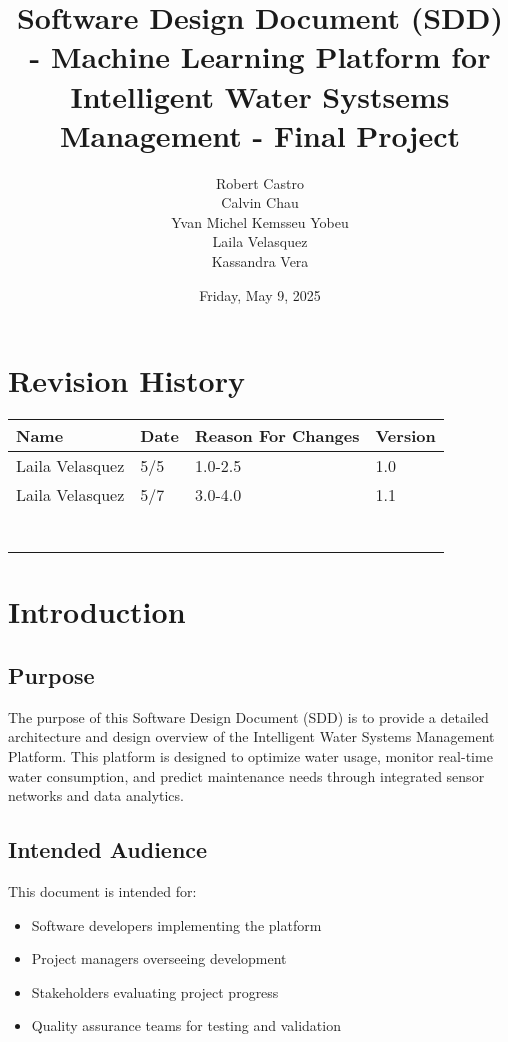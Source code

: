 \documentclass{article}
\title{Software Design Document (SDD) - Machine Learning Platform for Intelligent Water Systsems Management - Final Project}
\author{Robert Castro\\
Calvin Chau\\
Yvan Michel Kemsseu Yobeu\\
Laila Velasquez\\
Kassandra Vera}
\date{Friday, May 9, 2025}
\begin{document}
\maketitle
\newpage
\tableofcontents

\newpage

\section*{Revision History}
\begin{center}
\begin{tabular}{|l|l|l|l|}
\hline
Name & Date & Reason For Changes & Version \\
\hline
Laila Velasquez & 5/5 & 1.0-2.5 & 1.0 \\
\hline
Laila Velasquez & 5/7 & 3.0-4.0 & 1.1 \\
\hline
 &  &  &  \\
\hline
 &  &  &  \\
\hline
 &  &  &  \\
\hline
 &  &  &  \\
\hline
 &  &  &  \\
\hline
 &  &  &  \\
\hline
 &  &  &  \\
\hline
\end{tabular}
\end{center}
\newpage

\section{Introduction}
\subsection{Purpose}
The purpose of this Software Design Document (SDD) is to provide a detailed architecture and design overview of the Intelligent Water Systems Management Platform. This platform is designed to optimize water usage, monitor real-time water consumption, and predict maintenance needs through integrated sensor networks and data analytics.

\subsection{Intended Audience}
This document is intended for:
\begin{itemize}
\item Software developers implementing the platform
\item Project managers overseeing development
\item Stakeholders evaluating project progress
\item Quality assurance teams for testing and validation
\end{itemize}
\end{document}
